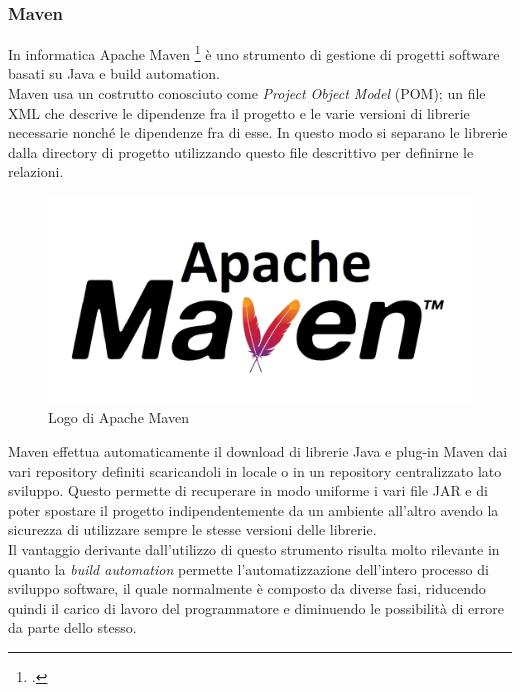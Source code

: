 \subsubsection*{Maven}
\noindent In informatica Apache Maven \footcite{maven} è uno strumento di gestione di progetti software basati su Java e build automation. \\
Maven usa un costrutto conosciuto come \textit{Project Object Model} (POM); un file XML che descrive le dipendenze fra il progetto e le varie versioni di librerie necessarie nonché le dipendenze fra di esse. In questo modo si separano le librerie dalla directory di progetto utilizzando questo file descrittivo per definirne le relazioni.
\begin{figure}[h] 
    \centering 
    \includegraphics[width=0.6\columnwidth]{immagini/cap4/Apache-maven.jpg} 
    \caption{Logo di Apache Maven}
\end{figure}
Maven effettua automaticamente il download di librerie Java e plug-in Maven dai vari repository definiti scaricandoli in locale o in un repository centralizzato lato sviluppo. Questo permette di recuperare in modo uniforme i vari file JAR e di poter spostare il progetto indipendentemente da un ambiente all'altro avendo la sicurezza di utilizzare sempre le stesse versioni delle librerie. \\
Il vantaggio derivante dall'utilizzo di questo strumento risulta molto rilevante in quanto la \textit{build automation} permette l'automatizzazione dell'intero processo di sviluppo software, il quale normalmente è composto da diverse fasi, riducendo quindi il carico di lavoro del programmatore e diminuendo le possibilità di errore da parte dello stesso.

